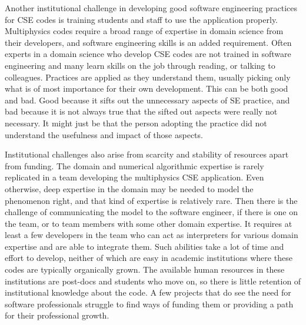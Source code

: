 Another institutional challenge in developing good software
engineering practices for CSE codes is training students and staff to
use the application properly. Multiphysics codes require a broad range
of expertise in domain science from their developers, and software
engineering skills is an added requirement.  Often experts in a domain
science who develop CSE codes are not trained in software engineering
and many learn skills on the job through reading, or talking to
colleagues. Practices are applied as they understand them, usually
picking only what is of most importance for their own development.
This can be both good and bad. Good because it sifts out the unnecessary aspects of SE
practice, and bad because it is not always true that the sifted out
aspects were really not necessary. It might just be that the person
adopting the practice did not understand the usefulness and impact of
those aspects.


Institutional challenges also arise from scarcity and stability of
resources apart from funding. The domain and numerical algorithmic
expertise is rarely replicated in a team developing the multiphysics
CSE application.  Even otherwise, deep expertise in the domain may be
needed to model the phenomenon right, and that kind of expertise is
relatively rare. Then there is the challenge of communicating the
model to the software engineer, if there is one on the team, or to
team members with some other domain expertise. It requires at least a
few developers in the team who can act as interpreters for various
domain expertise and are able to integrate them. Such abilities take a
lot of time and effort to develop, neither of which are
easy in academic institutions where these codes are typically
organically grown. The available human resources in these institutions
are post-docs and students who move on, so there is little retention of
institutional knowledge about the code.  A few projects that do see
the need for software professionals struggle to find ways of funding
them or providing a path for their professional growth. 

